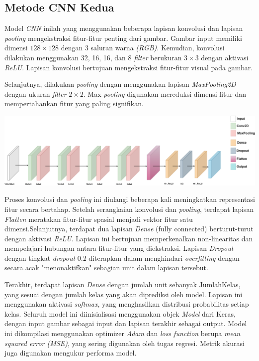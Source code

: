 \subsection{Metode CNN Kedua}

Model \textit{CNN} inilah yang menggunakan beberapa lapisan konvolusi dan lapisan \textit{pooling} mengekstraksi fitur-fitur penting dari gambar. Gambar input memiliki dimensi $128 \times 128$ dengan 3 saluran warna \textit{(RGB)}. Kemudian, konvolusi dilakukan menggunakan 32, 16, 16, dan 8 \textit{filter} berukuran $3 \times 3$ dengan aktivasi \textit{ReLU}. Lapisan konvolusi bertujuan mengekstraksi fitur-fitur visual pada gambar.

Selanjutnya, dilakukan \textit{pooling} dengan menggunakan lapisan \textit{MaxPooling2D} dengan ukuran \textit{filter} $2 \times 2$. Max \textit{pooling} digunakan mereduksi dimensi fitur dan mempertahankan fitur yang paling signifikan.

\begin{center}
	\includegraphics[width=1.0\linewidth]{gambar/bener/Arsitektur_CNN2_Revisi.png}
	\label{fig:layerCNN}
\end{center}

Proses konvolusi dan \textit{pooling} ini diulangi beberapa kali meningkatkan representasi fitur secara bertahap. Setelah serangkaian konvolusi dan \textit{pooling}, terdapat lapisan \textit{Flatten} meratakan fitur-fitur spasial menjadi vektor fitur satu dimensi.Selanjutnya, terdapat dua lapisan \textit{Dense} (fully connected) berturut-turut dengan aktivasi \textit{ReLU}. Lapisan ini bertujuan memperkenalkan non-linearitas dan mempelajari hubungan antara fitur-fitur yang diekstraksi. Lapisan \textit{Dropout} dengan tingkat \textit{dropout} 0.2 diterapkan dalam menghindari \textit{overfitting} dengan secara acak "menonaktifkan" sebagian unit dalam lapisan tersebut.

Terakhir, terdapat lapisan \textit{Dense} dengan jumlah unit sebanyak JumlahKelas, yang sesuai dengan jumlah kelas yang akan diprediksi oleh model. Lapisan ini menggunakan aktivasi \textit{softmax}, yang menghasilkan distribusi probabilitas setiap kelas. Seluruh model ini diinisialisasi menggunakan objek \textit{Model} dari Keras, dengan input gambar sebagai input dan lapisan terakhir sebagai output. Model ini dikompilasi menggunakan optimizer \textit{Adam} dan \textit{loss function} berupa \textit{mean squared error (MSE)}, yang sering digunakan oleh tugas regresi. Metrik akurasi juga digunakan mengukur performa model.

